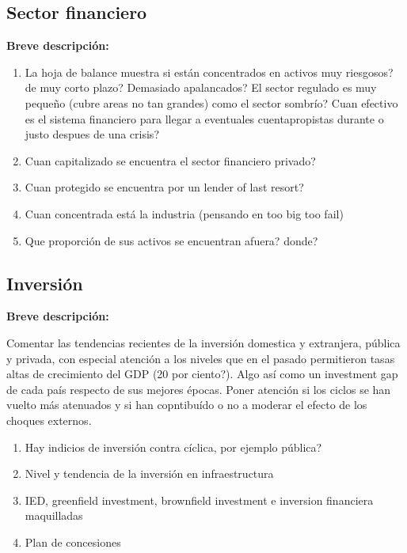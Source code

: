 \documentclass[12pt,a4paper]{article}
\begin{document}
\vspace{0.5cm}
\subsection{Sector financiero}
\textbf{Breve descripción:} \newline

\begin{enumerate}
	\item La hoja de balance muestra si están concentrados en activos muy riesgosos? de muy corto plazo? Demasiado apalancados? El sector regulado es muy pequeño (cubre areas no tan grandes) como el sector sombrío? Cuan efectivo es el sistema financiero para llegar a eventuales cuentapropistas durante o justo despues de una crisis?
	\item Cuan capitalizado se encuentra el sector financiero privado?
	\item Cuan protegido se encuentra por un lender of last resort?
	\item Cuan concentrada está la industria (pensando en too big too fail) 
	\item Que proporción de sus activos se encuentran afuera? donde?
\end{enumerate}



\vspace{0.5cm}

\subsection{Inversión}
\textbf{Breve descripción:} \newline

Comentar las tendencias recientes de la inversión domestica y extranjera, pública y privada, con especial atención a los niveles que en el pasado permitieron tasas altas de crecimiento del GDP (20 por ciento?). Algo así como un investment gap de cada país respecto de sus mejores épocas. Poner atención si los ciclos se han vuelto más atenuados y si han copntibuído o no a moderar el efecto de los choques externos.

\begin{enumerate}
	\item Hay indicios de inversión contra cíclica, por ejemplo pública?
	\item Nivel y tendencia de la inversión en infraestructura
	\item IED, greenfield investment, brownfield investment e inversion financiera maquilladas
	\item Plan de concesiones
\end{enumerate}
\end{document}
